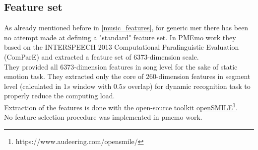 \subsection{Feature set}
As already mentioned before in \ref{music_features}, for generic \gls{mer} there has been no attempt made at defining a "standard" feature set. In PMEmo work \cite{zhang2018pmemo} they based on the INTERSPEECH 2013 Computational Paralinguistic Evaluation (ComParE) and extracted a feature set of 6373-dimension scale.
\\
They provided all 6373-dimension features in song level for the sake of static emotion task. They extracted only the core of 260-dimension features in segment level (calculated in $1s$ window with $0.5s$ overlap) for dynamic recognition task to properly reduce the computing load.
\\
Extraction of the features is done with the open-source toolkit \href{https://www.audeering.com/opensmile/}{openSMILE}\footnote{https://www.audeering.com/opensmile/}.
\\
No feature selection procedure was implemented in \gls{pmemo} work.


